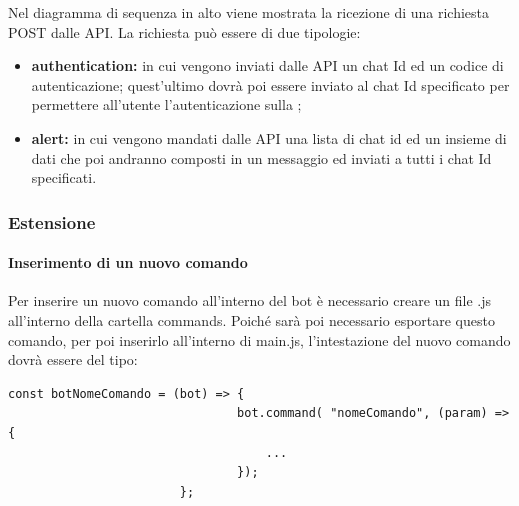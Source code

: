 	Nel diagramma di sequenza in alto viene mostrata la ricezione di una richiesta POST dalle API. La richiesta può essere di due tipologie: 
	\begin{itemize}
		\item \textbf{authentication:} in cui vengono inviati dalle API un chat Id ed un codice di autenticazione; quest'ultimo dovrà poi essere inviato al chat Id specificato per permettere all'utente l'autenticazione sulla ;
		\item \textbf{alert:} in cui vengono mandati dalle API una lista di chat id ed un insieme di dati che poi andranno composti in un messaggio ed inviati a tutti i chat Id specificati.
	\end{itemize}
\subsubsection{Estensione}
	\paragraph{Inserimento di un nuovo comando}
		Per inserire un nuovo comando all'interno del bot è necessario creare un file .js all'interno della cartella commands.
		\newline
		Poiché sarà poi necessario esportare questo comando, per poi inserirlo all'interno di main.js, l'intestazione del nuovo comando dovrà essere del tipo:
		\begin{verbatim}const botNomeComando = (bot) => {
								bot.command( "nomeComando", (param) => {
							 		...
							 	});
						}; 
		\end{verbatim}	